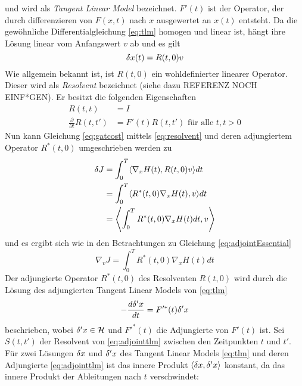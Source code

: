 und wird als \textit{Tangent Linear Model} bezeichnet. $F'(t)$ ist der Operator, der durch differenzieren von $F(x,t)$ nach $x$ ausgewertet an $x(t)$ entsteht. Da die gewöhnliche Differentialgleichung \eqref{eq:tlm} homogen und linear ist, hängt ihre Lösung linear vom Anfangswert $v$ ab und es gilt
\begin{equation}
\label{eq:resolvent}
 \delta x(t) = R(t,0)v
\end{equation}
Wie allgemein bekannt ist, ist $R(t,0)$ ein wohldefinierter linearer Operator. Dieser wird als \textit{Resolvent} bezeichnet (siehe dazu REFERENZ NOCH EINF*GEN). Er besitzt die folgenden Eigenschaften
\begin{align}
  R(t,t) &= I \label{eq:resolventPropertiesA}\\
  \frac{\partial}{\partial t}R(t,t') &= F'(t)R(t,t') \text{ für alle } t,t>0\label{eq:resolventPropertiesB}
\end{align}
Nun kann Gleichung \eqref{eq:gatcost} mittels \eqref{eq:resolvent} und deren adjungiertem Operator $R^*(t,0)$ umgeschrieben werden zu
\begin{equation*}
\begin{aligned}
 \delta J &= \int_0^T \langle \nabla_x H(t), R(t,0)v\rangle dt \\
	    &= \int_0^T \langle R^*(t,0) \nabla_x H(t), v\rangle dt \\
	    &= \left\langle \int_0^T R^*(t,0) \nabla_x H(t) dt, v\right\rangle \\
\end{aligned}
\end{equation*}
und es ergibt sich wie in den Betrachtungen zu Gleichung \eqref{eq:adjointEssential} %
\begin{equation}
\label{eq:gradCostFunctional}
 \nabla_v J = \int_0^T R^*(t,0) \nabla_x H(t) dt
\end{equation}
Der adjungierte Operator $R^*(t,0)$ des Resolventen $R(t,0)$ wird durch die Lösung des adjungierten Tangent Linear Models von \eqref{eq:tlm} 
\begin{equation}
\label{eq:adjointtlm}
 -\frac{d \delta'x}{dt} = F'^*(t)\delta'x
\end{equation}
beschrieben, wobei $\delta'x \in\mathcal{H}$ und $F'^*(t)$ die Adjungierte von $F'(t)$ ist. 
Sei $S(t,t')$ der Resolvent von \eqref{eq:adjointtlm} zwischen den Zeitpunkten $t$ und $t'$. Für zwei Lösungen $\delta x$ und $\delta' x$ des Tangent Linear Models \eqref{eq:tlm} und deren Adjungierte \eqref{eq:adjointtlm} ist das innere Produkt $\langle \delta x,\delta' x\rangle$ konstant, da das innere Produkt der Ableitungen nach $t$ verschwindet:
